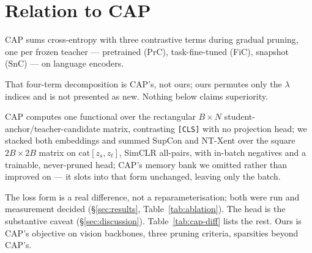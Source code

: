 \section{Relation to CAP}
\label{sec:cap}

CAP \citep{xu2022cap} sums cross-entropy with three contrastive terms during
gradual pruning, one per frozen teacher --- pretrained (PrC), task-fine-tuned
(FiC), snapshot (SnC) --- on language encoders.

That four-term decomposition is CAP's, not ours; ours permutes only the
$\lambda$ indices and is not presented as new. Nothing below claims superiority.

CAP computes one functional over the rectangular $B \times N$
student-anchor/teacher-candidate matrix, contrasting \texttt{[CLS]} with no
projection head; we stacked both embeddings and summed SupCon and NT-Xent over
the square $2B \times 2B$ matrix on $\mathrm{cat}[z_s, z_t]$, SimCLR all-pairs,
with in-batch negatives and a trainable, never-pruned head; CAP's memory bank we
omitted rather than improved on --- it slots into that form unchanged, leaving
only the batch.

The loss form is a real difference, not a reparameterisation; both were run and
measurement decided (\S\ref{sec:results}, Table~\ref{tab:ablation}). The head is
the substantive caveat (\S\ref{sec:discussion}). Table~\ref{tab:cap-diff} lists
the rest. Ours is CAP's objective on vision backbones, three pruning criteria,
sparsities beyond CAP's.
